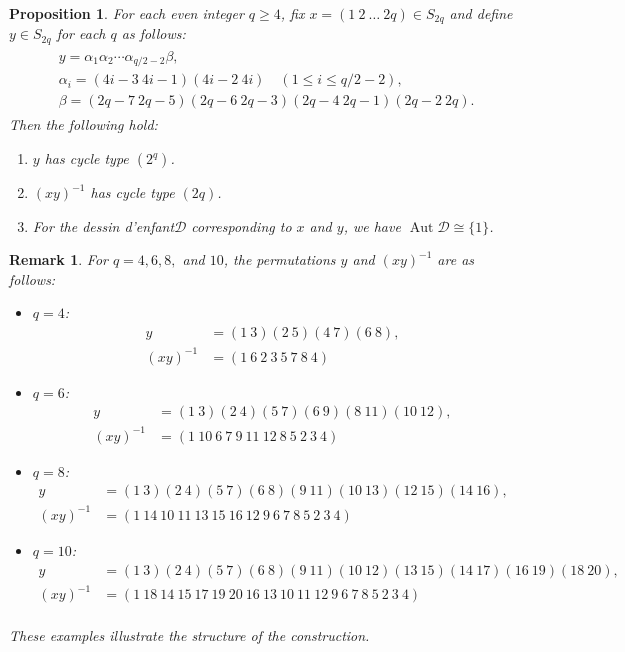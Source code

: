 \documentclass[12pt,reqno]{amsart}
\newcommand{\msD}{\mathscr{D}}
\newcommand{\A}{\alpha}									%
\newcommand{\B}{\beta}									%
\newcommand{\q}{\quad}									%
\DeclareMathOperator{\Aut}{Aut}							%
\theoremstyle{mythmstyle}
\newtheorem{prop}[lemma]{Proposition}
\theoremstyle{mydefstyle}
\newtheorem{rem}[lemma]{Remark}
\newcommand{\dde}{dessin d'enfant\xspace}
\newcommand{\AD}{\Aut{\msD}}
\numberwithin{equation}{section}
\begin{document}
\begin{prop}
\label{prop:c2b2}
For each even integer $q \ge 4$, fix $x = (1\ 2\ \ldots\ 2q) \in S_{2q}$ and define $y \in S_{2q}$ for each $q$ as follows:
\begin{align}
\begin{aligned}
\label{eq:yqdef2}
&y = \A_{1}\A_{2}\cdots \A_{q/2-2}\B, \\
&\A_{i} = (4i{-}3\ 4i{-}1)(4i{-}2\ 4i)\q (1 \le i \le q/2-2), \\
&\B = (2q{-}7\ 2q{-}5)(2q{-}6\ 2q{-}3)(2q{-}4\ 2q{-}1)(2q{-}2\ 2q).
\end{aligned}
\end{align}
Then the following hold:
\begin{enumerate}
\item\label{itm:c2b2-1} $y$ has cycle type $(2^{q})$.
\item\label{itm:c2b2-2} $(xy)^{-1}$ has cycle type $(2q)$.
\item\label{itm:c2b2-3} For the \dde $\msD$ corresponding to $x$ and $y$, we have $\AD \cong \{ 1 \}$.
\end{enumerate}
\end{prop}

\begin{rem}
For $q = 4, 6, 8,$ and $10$, the permutations $y$ and $(xy)^{-1}$ are as follows:
\begin{itemize}
\item $q=4$:
\begin{align}
y&=(1\ 3)(2\ 5)(4\ 7)(6\ 8), \\
(xy)^{-1}&=(1\ 6\ 2\ 3\ 5\ 7\ 8\ 4)
\end{align}
\item $q=6$:
\begin{align}
y&=(1\ 3)(2\ 4)(5\ 7)(6\ 9)(8\ 11)(10\ 12), \\
(xy)^{-1}&=(1\ 10\ 6\ 7\ 9\ 11\ 12\ 8\ 5\ 2\ 3\ 4)
\end{align}
\item $q=8$:
\begin{align}
y&=(1\ 3)(2\ 4)(5\ 7)(6\ 8)(9\ 11)(10\ 13)(12\ 15)(14\ 16), \\
(xy)^{-1}&=(1\ 14\ 10\ 11\ 13\ 15\ 16\ 12\ 9\ 6\ 7\ 8\ 5\ 2\ 3\ 4)
\end{align}
\item $q=10$:
\begin{align}
y &= (1\ 3)(2\ 4)(5\ 7)(6\ 8)(9\ 11)(10\ 12)(13\ 15)(14\ 17)(16\ 19)(18\ 20), \\
(xy)^{-1}&= (1\ 18\ 14\ 15\ 17\ 19\ 20\ 16\ 13\ 10\ 11\ 12\ 9\ 6\ 7\ 8\ 5\ 2\ 3\ 4) \\
\end{align}
\end{itemize}
These examples illustrate the structure of the construction.
\end{rem}
\end{document}
